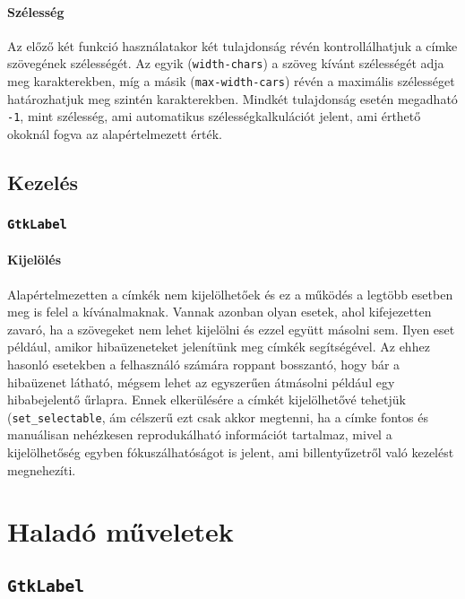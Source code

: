 \paragraph{Szélesség}

Az előző két funkció használatakor két tulajdonság révén kontrollálhatjuk a címke szövegének szélességét. Az egyik (\texttt{width-chars}) a szöveg kívánt szélességét adja meg karakterekben, míg a másik (\texttt{max-width-cars}) révén a maximális szélességet határozhatjuk meg szintén karakterekben. Mindkét tulajdonság esetén megadható \texttt{-1}, mint szélesség, ami automatikus szélességkalkulációt jelent, ami érthető okoknál fogva az alapértelmezett érték.

\subsection{Kezelés}

\subsubsection{\texttt{GtkLabel}}

\paragraph{Kijelölés}

Alapértelmezetten a címkék nem kijelölhetőek és ez a működés a legtöbb esetben meg is felel a kívánalmaknak. Vannak azonban olyan esetek, ahol kifejezetten zavaró, ha a szövegeket nem lehet kijelölni és ezzel együtt másolni sem. Ilyen eset például, amikor hibaüzeneteket jelenítünk meg címkék segítségével. Az ehhez hasonló esetekben a felhasználó számára roppant bosszantó, hogy bár a hibaüzenet látható, mégsem lehet az egyszerűen átmásolni például egy hibabejelentő űrlapra. Ennek elkerülésére a címkét kijelölhetővé tehetjük (\texttt{set\_selectable}, ám célszerű ezt csak akkor megtenni, ha a címke fontos és manuálisan nehézkesen reprodukálható információt tartalmaz, mivel a kijelölhetőség egyben fókuszálhatóságot is jelent, ami billentyűzetről való kezelést megnehezíti.

\section{Haladó műveletek}

\subsection{\texttt{GtkLabel}}


